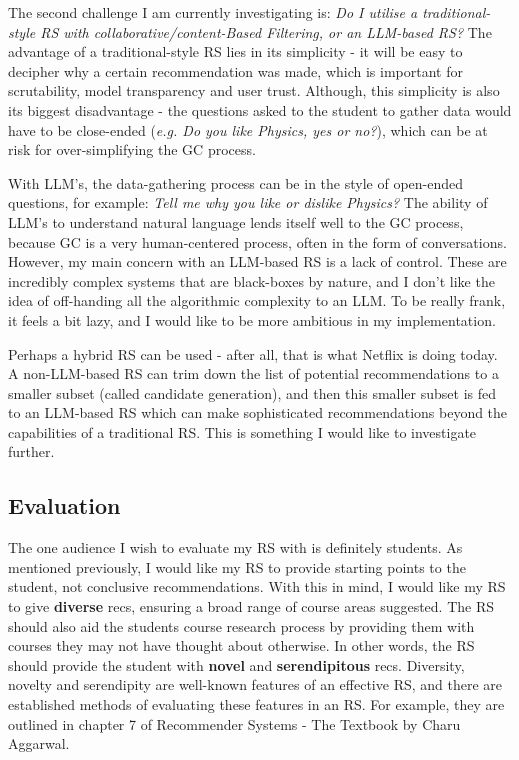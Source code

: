 \documentclass{article}  %
\begin{document}
    The second challenge I am currently investigating is: \emph{Do I utilise a traditional-style RS with collaborative/content-Based Filtering, or 
    an LLM-based RS?} The advantage of a traditional-style RS lies in its simplicity - it will be easy to decipher why a certain recommendation was made,
    which is important for scrutability, model transparency and user trust. 
    Although, this simplicity is also its biggest disadvantage - the questions asked to the student to gather data would have to be close-ended (\emph{e.g. Do you like Physics, yes or no?}), 
    which can be at risk for over-simplifying the GC process.

    With LLM's, the data-gathering process can be in the style of open-ended questions, for example: \emph{Tell me why you like or dislike Physics?}
    The ability of LLM's to understand natural language lends itself well to the GC process, because GC is a very human-centered process, 
    often in the form of conversations. However, my main concern with an LLM-based RS is a lack of control. 
    These are incredibly complex systems that are black-boxes by nature, and I don't like the idea of off-handing all the algorithmic complexity
    to an LLM. 
    To be really frank, it feels a bit lazy, and I would like to be more ambitious in my implementation.

    Perhaps a hybrid RS can be used - after all, that is what Netflix is doing today. 
    A non-LLM-based RS can trim down the list of potential recommendations to a smaller subset (called candidate generation),
    and then this smaller subset is fed to an LLM-based RS which can make sophisticated recommendations beyond the capabilities of 
    a traditional RS. This is something I would like to investigate further.

    \newpage

    \subsection*{Evaluation}

    The one audience I wish to evaluate my RS with is definitely students. 
    As mentioned previously, I would like my RS to provide starting points to the student, not conclusive recommendations.
    With this in mind, I would like my RS to give \textbf{diverse} recs, ensuring a broad range of course areas suggested.
    The RS should also aid the students course research process by providing them with courses they may not have thought about 
    otherwise. In other words, the RS should provide the student with \textbf{novel} and \textbf{serendipitous} recs.
    Diversity, novelty and serendipity are well-known features of an effective RS, and there are established methods of evaluating these 
    features in an RS. For example, they are outlined in chapter 7 of Recommender Systems - The Textbook by Charu Aggarwal.
\end{document}
